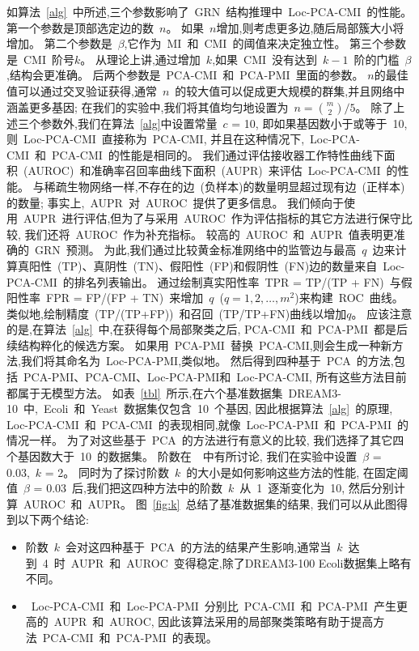如算法~\ref{alg}~中所述,三个参数影响了~GRN~结构推理中~Loc-PCA-CMI~的性能。
第一个参数是顶部选定边的数~$n$。
如果~$n$增加,则考虑更多边,随后局部簇大小将增加。
第二个参数是~$\beta$,它作为~MI~和~CMI~的阈值来决定独立性。
第三个参数是~CMI~阶号$k$。
从理论上讲,通过增加~$k$,如果~CMI~没有达到~$k-1$~阶的门槛~$\beta$,结构会更准确。
后两个参数是~PCA-CMI~和~PCA-PMI~里面的参数。
$n$的最佳值可以通过交叉验证获得,通常~$n$~的较大值可以促成更大规模的群集,并且网络中涵盖更多基因;
在我们的实验中,我们将其值均匀地设置为~$n =\binom{m} {2}/5$。
除了上述三个参数外,我们在算法~\ref{alg}中设置常量~$c$ = 10,
即如果基因数小于或等于~10,则~Loc-PCA-CMI~直接称为~PCA-CMI,
并且在这种情况下,~Loc-PCA-CMI~和~PCA-CMI~的性能是相同的。
我们通过评估接收器工作特性曲线下面积~(AUROC)~和准确率召回率曲线下面积~(AUPR)~来评估~Loc-PCA-CMI~的性能。
与稀疏生物网络一样,不存在的边~(负样本)的数量明显超过现有边~(正样本)的数量; 
事实上,~AUPR~对~AUROC~\cite{saito2015precision}提供了更多信息。
我们倾向于使用~AUPR~进行评估,但为了与采用~AUROC~作为评估指标的其它方法进行保守比较,
我们还将~AUROC~作为补充指标。
较高的~AUROC~和~AUPR~值表明更准确的~GRN~预测。
为此,我们通过比较黄金标准网络中的监管边与最高~$q$~边来计算真阳性~(TP)、真阴性~(TN)、假阳性~(FP)和假阴性~(FN)边的数量来自~Loc-PCA-CMI~的排名列表输出。
通过绘制真实阳性率~TPR = TP/(TP + FN)~与假阳性率~FPR = FP/(FP + TN)~来增加~$q$~($q = 1, 2, \ldots, m^2$)来构建~ROC~曲线。
类似地,绘制精度~(TP/(TP+FP))~和召回~(TP/TP+FN)曲线以增加$q$。
应该注意的是,在算法~\ref{alg}~中,在获得每个局部聚类之后, PCA-CMI~和~PCA-PMI~都是后续结构粹化的候选方案。
如果用~PCA-PMI~替换~PCA-CMI,则会生成一种新方法,我们将其命名为~Loc-PCA-PMI,类似地。
然后得到四种基于~PCA~的方法,包括~PCA-PMI、PCA-CMI、Loc-PCA-PMI和~Loc-PCA-CMI,
所有这些方法目前都属于无模型方法。
如表~\ref{tbl}~所示,在六个基准数据集~DREAM3-10~中,~Ecoli~和~Yeast~数据集仅包含~10~个基因,
因此根据算法~\ref{alg}~的原理,
Loc-PCA-CMI~和~PCA-CMI~的表现相同,就像~Loc-PCA-PMI~和~PCA-PMI~的情况一样。
为了对这些基于~PCA~的方法进行有意义的比较,
我们选择了其它四个基因数大于~10~的数据集。
阶数在~\cite{zhang2011inferring,zhao2016part}~中有所讨论,
我们在实验中设置~$\beta$ = 0.03,~$k$ = 2。
同时为了探讨阶数~$k$~的大小是如何影响这些方法的性能,
在固定阈值~$\beta$ = 0.03~后,我们把这四种方法中的阶数~$k$~从~1~逐渐变化为~10,
然后分别计算~AUROC~和~AUPR。
图~\ref{fig:k}~总结了基准数据集的结果, 我们可以从此图得到以下两个结论:
\begin{itemize}
    \item 阶数~$k$~会对这四种基于~PCA~的方法的结果产生影响,通常当~$k$~达到~4~时~AUPR~和~AUROC~变得稳定,除了DREAM3-100 Ecoli数据集上略有不同。
    \item ~Loc-PCA-CMI~和~Loc-PCA-PMI~分别比~PCA-CMI~和~PCA-PMI~产生更高的~AUPR~和~AUROC,
    因此该算法采用的局部聚类策略有助于提高方法~PCA-CMI~和~PCA-PMI~的表现。
\end{itemize}

